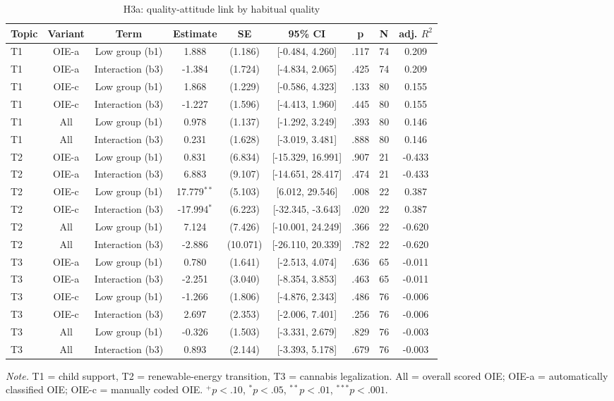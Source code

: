 \begin{table}[htbp]
\centering
\begin{threeparttable}
\caption{H3a: quality-attitude link by habitual quality}
\label{tab:tab_h3a_quality_moderation}
\begin{tabular}{lcccccccc}
\toprule
  Topic & Variant & Term & Estimate & SE & 95\% CI & p & N & adj. $R^2$ \\
\midrule
  T1 & OIE-a & Low group (b1) & 1.888 & (1.186) & [-0.484, 4.260] & .117 & 74 & 0.209 \\
  T1 & OIE-a & Interaction (b3) & -1.384 & (1.724) & [-4.834, 2.065] & .425 & 74 & 0.209 \\
  T1 & OIE-c & Low group (b1) & 1.868 & (1.229) & [-0.586, 4.323] & .133 & 80 & 0.155 \\
  T1 & OIE-c & Interaction (b3) & -1.227 & (1.596) & [-4.413, 1.960] & .445 & 80 & 0.155 \\
  T1 & All & Low group (b1) & 0.978 & (1.137) & [-1.292, 3.249] & .393 & 80 & 0.146 \\
  T1 & All & Interaction (b3) & 0.231 & (1.628) & [-3.019, 3.481] & .888 & 80 & 0.146 \\
  T2 & OIE-a & Low group (b1) & 0.831 & (6.834) & [-15.329, 16.991] & .907 & 21 & -0.433 \\
  T2 & OIE-a & Interaction (b3) & 6.883 & (9.107) & [-14.651, 28.417] & .474 & 21 & -0.433 \\
  T2 & OIE-c & Low group (b1) & 17.779$^{**}$ & (5.103) & [6.012, 29.546] & .008 & 22 & 0.387 \\
  T2 & OIE-c & Interaction (b3) & -17.994$^{*}$ & (6.223) & [-32.345, -3.643] & .020 & 22 & 0.387 \\
  T2 & All & Low group (b1) & 7.124 & (7.426) & [-10.001, 24.249] & .366 & 22 & -0.620 \\
  T2 & All & Interaction (b3) & -2.886 & (10.071) & [-26.110, 20.339] & .782 & 22 & -0.620 \\
  T3 & OIE-a & Low group (b1) & 0.780 & (1.641) & [-2.513, 4.074] & .636 & 65 & -0.011 \\
  T3 & OIE-a & Interaction (b3) & -2.251 & (3.040) & [-8.354, 3.853] & .463 & 65 & -0.011 \\
  T3 & OIE-c & Low group (b1) & -1.266 & (1.806) & [-4.876, 2.343] & .486 & 76 & -0.006 \\
  T3 & OIE-c & Interaction (b3) & 2.697 & (2.353) & [-2.006, 7.401] & .256 & 76 & -0.006 \\
  T3 & All & Low group (b1) & -0.326 & (1.503) & [-3.331, 2.679] & .829 & 76 & -0.003 \\
  T3 & All & Interaction (b3) & 0.893 & (2.144) & [-3.393, 5.178] & .679 & 76 & -0.003 \\
\bottomrule
\end{tabular}
\begin{tablenotes}\footnotesize\item \textit{Note.} T1 = child support, T2 = renewable-energy transition, T3 = cannabis legalization. All = overall scored OIE; OIE-a = automatically classified OIE; OIE-c = manually coded OIE. $^{+}p<.10$, $^{*}p<.05$, $^{**}p<.01$, $^{***}p<.001$.\end{tablenotes}
\end{threeparttable}
\end{table}
